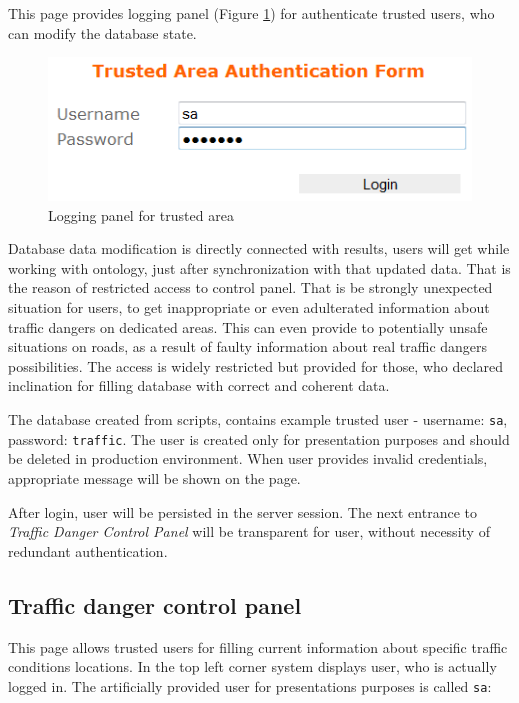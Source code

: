 This page provides logging panel (Figure \ref{fig:trustedAreaAuthenticationForm}) for authenticate trusted users, who can modify the database state. 

\medskip

\begin{figure}[htp]
\centering
\includegraphics[scale=0.6]{images/chapter4/TrustedAreaAuthenticationForm}
\caption{Logging panel for trusted area}
\label{fig:trustedAreaAuthenticationForm}
\end{figure}

\noindent Database data modification is directly connected with results, users will get while working with ontology, just after synchronization with that updated data. That is the reason of restricted access to control panel. That is be strongly unexpected situation for users, to get inappropriate or even adulterated information about traffic dangers on dedicated areas. This can even provide to potentially unsafe situations on roads, as a result of faulty information about real traffic dangers possibilities. The access is widely restricted but provided for those, who declared inclination for filling database with correct and coherent data.

The database created from scripts, contains example trusted user - username: \texttt{sa}, password: \texttt{traffic}. The user is created only for presentation purposes and should be deleted in production environment. When user provides invalid credentials, appropriate message will be shown on the page.

After login, user will be persisted in the server session. The next entrance to \textit{Traffic Danger Control Panel} will be transparent for user, without necessity of redundant authentication.

\newpage

\subsection{Traffic danger control panel}
\label{sub:trafficDangerControlPanel}

This page allows trusted users for filling current information about specific traffic conditions locations. In the top left corner system displays user, who is actually logged in. The artificially provided user for presentations purposes is called \texttt{sa}:

